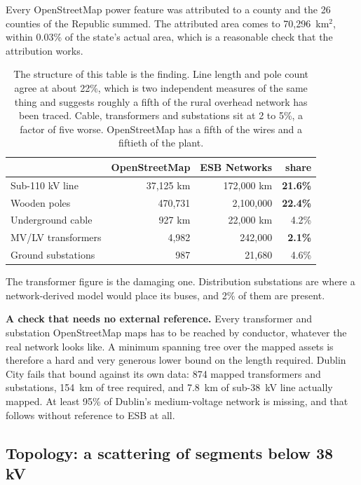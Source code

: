 \documentclass[11pt,a4paper]{article}
\begin{document}
Every OpenStreetMap power feature was attributed to a county and the 26
counties of the Republic summed. The attributed area comes to 70{,}296~km$^2$,
within 0.03\% of the state's actual area, which is a reasonable check that the
attribution works.

\begin{table}[H]\centering\small
\begin{tabular}{lrrr}
\toprule
& \textbf{OpenStreetMap} & \textbf{ESB Networks} & \textbf{share} \\
\midrule
Sub-110 kV line        & 37{,}125 km & 172{,}000 km & \textbf{21.6\%} \\
Wooden poles           & 470{,}731   & 2{,}100{,}000 & \textbf{22.4\%} \\
Underground cable      & 927 km      & 22{,}000 km  & 4.2\% \\
MV/LV transformers     & 4{,}982     & 242{,}000    & \textbf{2.1\%} \\
Ground substations     & 987         & 21{,}680     & 4.6\% \\
\bottomrule
\end{tabular}
\caption{The structure of this table is the finding. Line length and pole count
agree at about 22\%, which is two independent measures of the same thing and
suggests roughly a fifth of the rural overhead network has been traced. Cable,
transformers and substations sit at 2 to 5\%, a factor of five worse.
OpenStreetMap has a fifth of the wires and a fiftieth of the plant.}
\end{table}

The transformer figure is the damaging one. Distribution substations are where
a network-derived model would place its buses, and 2\% of them are present.

\textbf{A check that needs no external reference.} Every transformer and
substation OpenStreetMap maps has to be reached by conductor, whatever the real
network looks like. A minimum spanning tree over the mapped assets is therefore
a hard and very generous lower bound on the length required. Dublin City fails
that bound against its own data: 874 mapped transformers and substations,
154~km of tree required, and 7.8~km of sub-38~kV line actually mapped. At least
95\% of Dublin's medium-voltage network is missing, and that follows without
reference to ESB at all.


\subsection{Topology: a scattering of segments below 38 kV}
\end{document}
